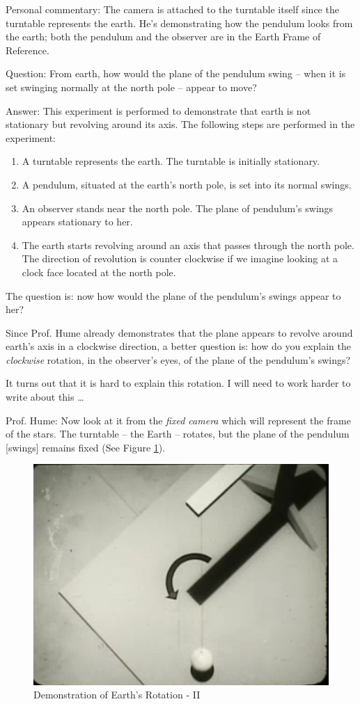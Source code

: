 \documentclass[a6paper]{article}
\newcommand{\perscom}[1]{
    {\footnotesize Personal commentary:  #1}
}
\begin{document}
\perscom{
    The camera is attached to the turntable itself since the turntable represents the earth. He's demonstrating how the pendulum looks from the earth; both the pendulum and the observer are in the Earth Frame of Reference.

    Question: From earth, how would the plane of the pendulum swing -- when it is set swinging normally at the north pole -- appear to move?

    Answer: This experiment is performed to demonstrate that earth is not stationary but revolving around its axis. The following steps are performed in the experiment:
    \begin{enumerate}
        \item A turntable represents the earth. The turntable is initially stationary.
        \item A pendulum, situated at the earth's north pole, is set into its normal swings.
        \item An observer stands near the north pole. The plane of pendulum's swings appears stationary to her. 
        \item The earth starts revolving around an axis that passes through the north pole. The direction of revolution is counter clockwise if we imagine looking at a clock face located at the north pole.
    \end{enumerate}

    The question is: now how would the plane of the pendulum's swings appear to her?

    Since Prof. Hume already demonstrates that the plane appears to revolve around earth's axis in a clockwise direction, a better question is: how do you explain the \emph{clockwise} rotation, in the observer's eyes, of the plane of the pendulum's swings?

    It turns out that it is hard to explain this rotation. I will need to work harder to write about this \dots
}

Prof. Hume: Now look at it from the \emph{fixed camera} which will represent the frame of the stars. The turntable -- the Earth -- rotates, but the plane of the pendulum [swings] remains fixed (See Figure \ref{fig: foucault-pendulum-2}).
        \begin{figure}[h!]
            \centering
            \includegraphics[width=0.5\linewidth]{foucault-pendulum-2.png}
            \caption{Demonstration of Earth's Rotation - II}
            \label{fig: foucault-pendulum-2}
        \end{figure}
\end{document}
